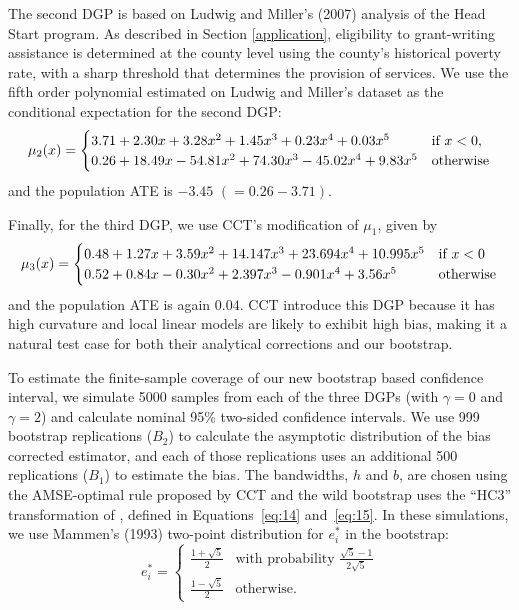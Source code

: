 \documentclass[12pt,fleqn]{article}
\begin{document}
\nocite{ludwig2007}%
The second DGP is based on Ludwig and Miller's (2007) analysis of the Head Start program.
As described in Section \ref{application}, eligibility to grant-writing assistance is determined
 at the county level using the county's historical poverty rate, with a sharp threshold that
 determines the provision of services. We use the fifth order polynomial estimated on Ludwig
 and Miller's dataset as the conditional expectation for the second DGP:
\begin{equation*}
  \mu_{2}(x) =
  \begin{cases}
    3.71 + 2.30x + 3.28x^2 + 1.45x^3 + 0.23x^4 + 0.03x^5
    & \text{if}\ x < 0, \\
    0.26 + 18.49x - 54.81x^2 + 74.30x^3 - 45.02x^4 + 9.83x^5
    & \text{otherwise}
  \end{cases}
\end{equation*}
and the population ATE is $-3.45$ $(= 0.26 - 3.71)$.

Finally, for the third DGP, we use CCT's modification of $\mu_1$, given by 
\begin{equation*}
  \mu_{3}(x) =
  \begin{cases}
    0.48 + 1.27x + 3.59 x^{2} + 14.147 x^3 + 23.694 x^4 + 10.995 x^5
    & \text{if}\ x < 0 \\
    0.52 + 0.84x - 0.30 x^{2} + 2.397 x^3 - 0.901 x^4 + 3.56 x^5
    & \text{otherwise}
\end{cases}
\end{equation*}
and the population ATE is again $0.04$. CCT introduce this DGP because it has
high curvature and local linear models are likely to exhibit high bias, making
it a natural test case for both their analytical corrections and our bootstrap.

To estimate the finite-sample coverage of our new bootstrap based confidence interval, we
simulate 5000 samples from each of the three DGPs (with $\gamma = 0$ and $\gamma = 2$) and calculate nominal 95\%
two-sided confidence intervals. We use 999 bootstrap replications ($B_2$) to
calculate the asymptotic distribution of the bias corrected estimator, and each
of those replications uses an additional 500 replications ($B_1$) to estimate
the bias. The bandwidths, $h$ and $b$,
are chosen using the AMSE-optimal rule proposed by CCT and the wild bootstrap
uses the ``HC3'' transformation of \citet{DF08}, defined in Equations~\eqref{eq:14}
and~\eqref{eq:15}. In these simulations, we use Mammen's (1993) \nocite{Mam93}
two-point distribution for $e_i^*$ in the bootstrap:
\begin{equation}
  \label{eq:19}
  e_i^* =
  \begin{cases}
    \frac{1 + \sqrt{5}}{2} & \text{with probability\ } \frac{\sqrt{5} - 1}{2 \sqrt{5}} \\
    \frac{1 - \sqrt{5}}{2} & \text{otherwise}.
  \end{cases}
\end{equation}
\end{document}
